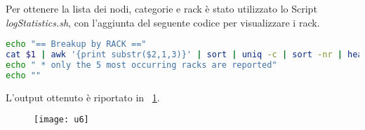  Per ottenere la lista dei nodi, categorie e rack è stato utilizzato lo Script
 \textit{logStatistics.sh}, con l'aggiunta del seguente codice per visualizzare
 i rack.\\

\begin{lstlisting}[language=bash]
echo "== Breakup by RACK =="
cat $1 | awk '{print substr($2,1,3)}' | sort | uniq -c | sort -nr | head -n 5 | awk '{print $2, $1}'
echo " * only the 5 most occurring racks are reported"
echo ""
\end{lstlisting}

L'output ottenuto è riportato in \figurename~\ref{u6}.\\

\begin{figure}[!htbp]
  \centering
  \texttt{[image: u6]}
  \label{u6}
\end{figure}
